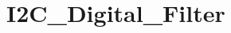 \hypertarget{group___i2_c___digital___filter}{\section{I2\-C\-\_\-\-Digital\-\_\-\-Filter}
\label{group___i2_c___digital___filter}
}
